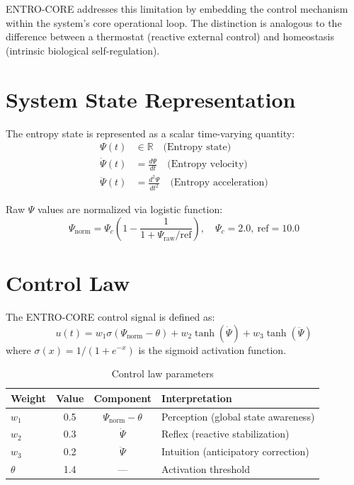 \documentclass[twocolumn]{article}
\begin{document}
ENTRO-CORE addresses this limitation by embedding the control mechanism within the system's core operational loop. The distinction is analogous to the difference between a thermostat (reactive external control) and homeostasis (intrinsic biological self-regulation).

\section{System State Representation}

The entropy state is represented as a scalar time-varying quantity:
\begin{align}
\Psi(t) &\in \mathbb{R} \quad \text{(Entropy state)} \\
\dot\Psi(t) &= \frac{d\Psi}{dt} \quad \text{(Entropy velocity)} \\
\ddot\Psi(t) &= \frac{d^2\Psi}{dt^2} \quad \text{(Entropy acceleration)}
\end{align}

Raw \(\Psi\) values are normalized via logistic function:
\[
\Psi_{\text{norm}} = \Psi_c \left(1 - \frac{1}{1 + \Psi_{\text{raw}} / \text{ref}}\right), \quad \Psi_c=2.0,\ \text{ref}=10.0
\]

\section{Control Law}

The ENTRO-CORE control signal is defined as:
\[
u(t) = w_1 \sigma(\Psi_{\text{norm}} - \theta) + w_2 \tanh(\dot\Psi) + w_3 \tanh(\ddot\Psi)
\]
where \(\sigma(x) = 1/(1+e^{-x})\) is the sigmoid activation function.

\begin{table}[h]
\centering
\caption{Control law parameters}
\begin{tabular}{lccp{6cm}}
\toprule
\textbf{Weight} & \textbf{Value} & \textbf{Component} & \textbf{Interpretation} \\
\midrule
\(w_1\) & 0.5 & \(\Psi_{\text{norm}} - \theta\) & Perception (global state awareness) \\
\(w_2\) & 0.3 & \(\dot\Psi\) & Reflex (reactive stabilization) \\
\(w_3\) & 0.2 & \(\ddot\Psi\) & Intuition (anticipatory correction) \\
\(\theta\) & 1.4 & — & Activation threshold \\
\bottomrule
\end{tabular}
\end{table}
\end{document}
